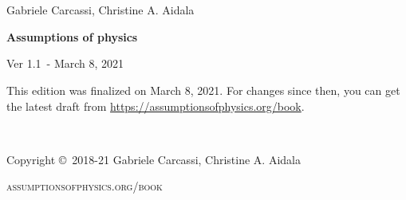 \documentclass[11pt,letterpaper,fleqn]{memoir} %
\newif\ifdraft
\newcommand{\bookversion}{1.1}
\newcommand{\bookdate}{March 8, 2021}
\begin{document}
	





\frontmatter
\thispagestyle{empty} %

\newpage
\thispagestyle{empty}
~
\newpage

~
\thispagestyle{empty}

\vspace{20pt}

{\large \noindent Gabriele Carcassi, Christine A. Aidala }

\vspace{60pt}

{\Huge \noindent \textbf{Assumptions of physics}}

\vspace{30pt}

\ifdraft {\large \noindent Working DRAFT for Ver \bookversion  ~- \today}
\else {\large \noindent Ver \bookversion  ~- \bookdate}
\fi

\vfill


\ifdraft 
\noindent \textbf{This book is a work in progress}. This draft is a development copy built on \today. It is provided as-is for the purpose of early review and feedback. You can get the latest draft from \url{https://assumptionsofphysics.org/book}. 
\else
\noindent This edition was finalized on \bookdate. For changes since then, you can get the latest draft from \url{https://assumptionsofphysics.org/book}.
\fi

\newpage
~\vfill
\thispagestyle{empty}

\noindent Copyright \copyright\ 2018-21 Gabriele Carcassi, Christine A. Aidala

\vspace{12pt}

\noindent \textsc{assumptionsofphysics.org/book}
\end{document}
